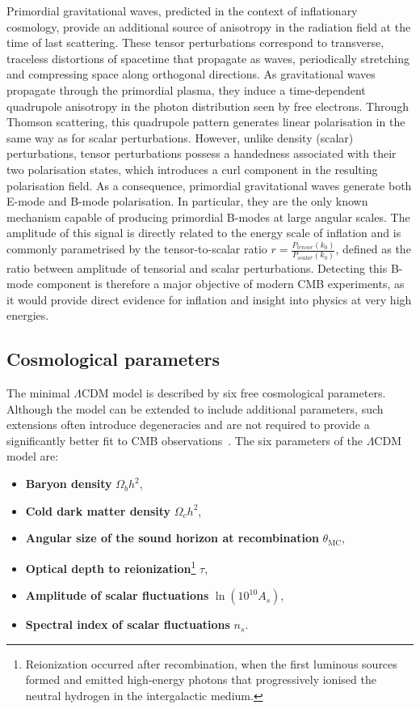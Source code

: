 \documentclass[../../thesis.tex]{subfiles}
\begin{document}
Primordial gravitational waves, predicted in the context of inflationary cosmology, provide an additional source of anisotropy in the radiation field at the time of last scattering. These tensor perturbations correspond to transverse, traceless distortions of spacetime that propagate as waves, periodically stretching and compressing space along orthogonal directions.
As gravitational waves propagate through the primordial plasma, they induce a time-dependent quadrupole anisotropy in the photon distribution seen by free electrons. Through Thomson scattering, this quadrupole pattern generates linear polarisation in the same way as for scalar perturbations. However, unlike density (scalar) perturbations, tensor perturbations possess a handedness associated with their two polarisation states, which introduces a curl component in the resulting polarisation field.
As a consequence, primordial gravitational waves generate both E-mode and B-mode polarisation. In particular, they are the only known mechanism capable of producing primordial B-modes at large angular scales. The amplitude of this signal is directly related to the energy scale of inflation and is commonly parametrised by the tensor-to-scalar ratio $r = \frac{P_{tensor}(k_0)}{P_{scalar}(k_0)}$, defined as the ratio between amplitude of tensorial and scalar perturbations. Detecting this B-mode component is therefore a major objective of modern CMB experiments, as it would provide direct evidence for inflation and insight into physics at very high energies.

\subsection{Cosmological parameters}

The minimal $\Lambda$CDM model is described by six free cosmological parameters. Although the model can be extended to include additional parameters, such extensions often introduce degeneracies and are not required to provide a significantly better fit to CMB observations~\cite{planck2018VI}. The six parameters of the $\Lambda$CDM model are:

\begin{itemize}
    \item \textbf{Baryon density} $\Omega_b h^2$,
    \item \textbf{Cold dark matter density} $\Omega_c h^2$,
    \item \textbf{Angular size of the sound horizon at recombination} $\theta_{\mathrm{MC}}$,
    \item \textbf{Optical depth to reionization}\footnote{Reionization occurred after recombination, when the first luminous sources formed and emitted high-energy photons that progressively ionised the neutral hydrogen in the intergalactic medium.} $\tau$,
    \item \textbf{Amplitude of scalar fluctuations} $\ln(10^{10} A_s)$,
    \item \textbf{Spectral index of scalar fluctuations} $n_s$.
\end{itemize}
\end{document}
